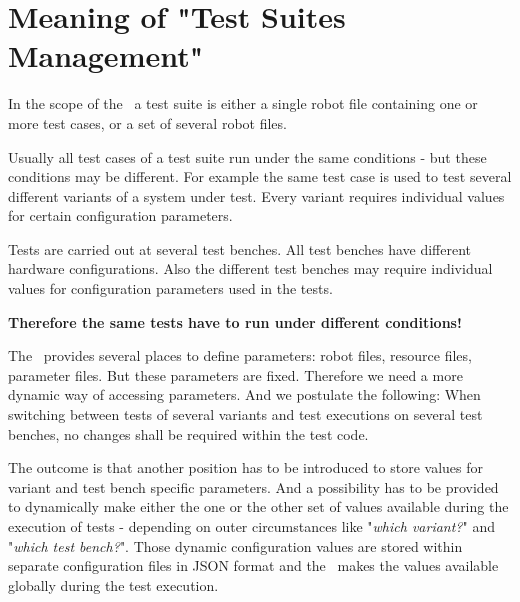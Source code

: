 %



%

\section{Meaning of "Test Suites Management"}

In the scope of the \rfwcore\ a test suite is either a single robot file containing one or more test cases, or a set of several robot files.

Usually all test cases of a test suite run under the same conditions - but these conditions may be different. For example the same test case is used
to test several different variants of a system under test. Every variant requires individual values for certain configuration parameters.

Tests are carried out at several test benches. All test benches have different hardware configurations.
Also the different test benches may require individual values for configuration parameters used in the tests.

\textbf{Therefore the same tests have to run under different conditions!}

The \rfwcore\ provides several places to define parameters: robot files, resource files, parameter files. But these parameters
are fixed. Therefore we need a more dynamic way of accessing parameters. And we postulate the following: When switching between
tests of several variants and test executions on several test benches, no changes shall be required within the test code.

The outcome is that another position has to be introduced to store values for variant and test bench specific parameters.
And a possibility has to be provided to dynamically make either the one or the other set of values available during the execution of
tests - depending on outer circumstances like "\textit{which variant?}" and "\textit{which test bench?}".
Those dynamic configuration values are stored within separate configuration files in JSON format and the \pkg\ makes the values
available globally during the test execution.

